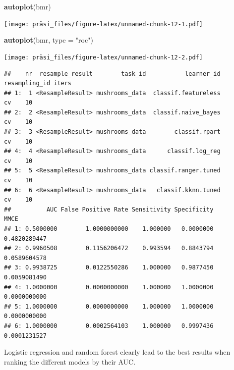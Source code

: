 \documentclass[
]{article}
\newenvironment{Shaded}{\begin{snugshade}}{\end{snugshade}}
\newcommand{\DataTypeTok}[1]{\textcolor[rgb]{0.13,0.29,0.53}{#1}}
\newcommand{\KeywordTok}[1]{\textcolor[rgb]{0.13,0.29,0.53}{\textbf{#1}}}
\newcommand{\NormalTok}[1]{#1}
\newcommand{\OperatorTok}[1]{\textcolor[rgb]{0.81,0.36,0.00}{\textbf{#1}}}
\newcommand{\StringTok}[1]{\textcolor[rgb]{0.31,0.60,0.02}{#1}}
\begin{document}
\begin{Shaded}
\begin{Highlighting}[]
\KeywordTok{autoplot}\NormalTok{(bmr)}
\end{Highlighting}
\end{Shaded}

\texttt{[image: präsi\_files/figure-latex/unnamed-chunk-12-1.pdf]}

\begin{Shaded}
\begin{Highlighting}[]
\KeywordTok{autoplot}\NormalTok{(bmr, }\DataTypeTok{type =} \StringTok{"roc"}\NormalTok{)}
\end{Highlighting}
\end{Shaded}

\texttt{[image: präsi\_files/figure-latex/unnamed-chunk-12-2.pdf]}

\begin{Shaded}
\end{Shaded}

\begin{verbatim}
##    nr  resample_result        task_id           learner_id resampling_id iters
## 1:  1 <ResampleResult> mushrooms_data  classif.featureless            cv    10
## 2:  2 <ResampleResult> mushrooms_data  classif.naive_bayes            cv    10
## 3:  3 <ResampleResult> mushrooms_data        classif.rpart            cv    10
## 4:  4 <ResampleResult> mushrooms_data      classif.log_reg            cv    10
## 5:  5 <ResampleResult> mushrooms_data classif.ranger.tuned            cv    10
## 6:  6 <ResampleResult> mushrooms_data   classif.kknn.tuned            cv    10
##          AUC False Positive Rate Sensitivity Specificity         MMCE
## 1: 0.5000000        1.0000000000    1.000000   0.0000000 0.4820289447
## 2: 0.9960508        0.1156206472    0.993594   0.8843794 0.0589604578
## 3: 0.9938725        0.0122550286    1.000000   0.9877450 0.0059081490
## 4: 1.0000000        0.0000000000    1.000000   1.0000000 0.0000000000
## 5: 1.0000000        0.0000000000    1.000000   1.0000000 0.0000000000
## 6: 1.0000000        0.0002564103    1.000000   0.9997436 0.0001231527
\end{verbatim}

Logistic regression and random forest clearly lead to the best results
when ranking the different models by their AUC.
\end{document}
